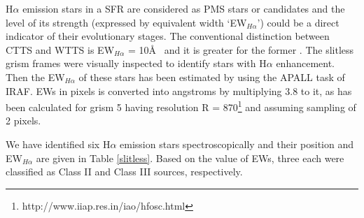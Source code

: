\documentclass[a4paper,fleqn,usenatbib,useAMS]{mnras}
\begin{document}
H$\alpha$ emission stars in a SFR are considered as PMS stars or candidates and
the level of its strength (expressed by equivalent width `EW$_{H\alpha}$')
could be a direct indicator of their evolutionary stages. The conventional distinction between
CTTS and WTTS is EW$_{H\alpha}$  = 10\AA~ and it is greater for the former \citep[cf.][]{1988cels.book.....H}.
The slitless grism frames were visually inspected to identify stars with H$\alpha$ enhancement.
Then the EW$_{H\alpha}$ of these stars has been estimated by using the APALL task of IRAF.
EWs in pixels is converted into angstroms by multiplying 3.8 to it, as has been calculated for grism 5 
having resolution R = 870\footnote{http://www.iiap.res.in/iao/hfosc.html} and 
assuming sampling of 2 pixels. 

We have identified six  H$\alpha$ emission stars spectroscopically and their position and EW$_{H\alpha}$ are given in Table \ref{slitless}. 
Based on the value of EWs, three each were classified as Class II and Class III sources, respectively. 
\end{document}
